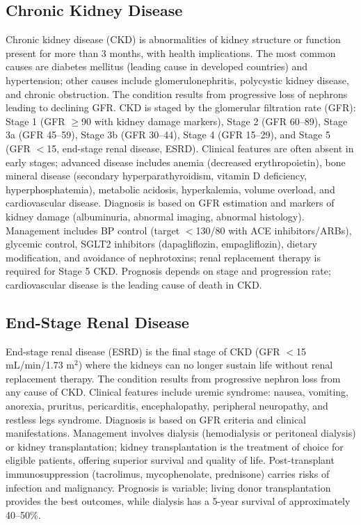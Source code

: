 
\label{sec:section:Chronic Kidney Disease}

\subsection{Chronic Kidney Disease}
\label{sec:Chronic Kidney Disease}
Chronic kidney disease (CKD) is abnormalities of kidney structure or function present for more than 3 months, with health implications. The most common causes are diabetes mellitus (leading cause in developed countries) and hypertension; other causes include glomerulonephritis, polycystic kidney disease, and chronic obstruction. The condition results from progressive loss of nephrons leading to declining GFR. CKD is staged by the glomerular filtration rate (GFR): Stage 1 (GFR $\geq$90 with kidney damage markers), Stage 2 (GFR 60--89), Stage 3a (GFR 45--59), Stage 3b (GFR 30--44), Stage 4 (GFR 15--29), and Stage 5 (GFR $<$15, end-stage renal disease, ESRD). Clinical features are often absent in early stages; advanced disease includes anemia (decreased erythropoietin), bone mineral disease (secondary hyperparathyroidism, vitamin D deficiency, hyperphosphatemia), metabolic acidosis, hyperkalemia, volume overload, and cardiovascular disease. Diagnosis is based on GFR estimation and markers of kidney damage (albuminuria, abnormal imaging, abnormal histology). Management includes BP control (target $<$130/80 with ACE inhibitors/ARBs), glycemic control, SGLT2 inhibitors (dapagliflozin, empagliflozin), dietary modification, and avoidance of nephrotoxins; renal replacement therapy is required for Stage 5 CKD. Prognosis depends on stage and progression rate; cardiovascular disease is the leading cause of death in CKD.

\subsection{End-Stage Renal Disease}
\label{sec:End-Stage Renal Disease}
End-stage renal disease (ESRD) is the final stage of CKD (GFR $<$15 mL/min/1.73 m$^2$) where the kidneys can no longer sustain life without renal replacement therapy. The condition results from progressive nephron loss from any cause of CKD. Clinical features include uremic syndrome: nausea, vomiting, anorexia, pruritus, pericarditis, encephalopathy, peripheral neuropathy, and restless legs syndrome. Diagnosis is based on GFR criteria and clinical manifestations. Management involves dialysis (hemodialysis or peritoneal dialysis) or kidney transplantation; kidney transplantation is the treatment of choice for eligible patients, offering superior survival and quality of life. Post-transplant immunosuppression (tacrolimus, mycophenolate, prednisone) carries risks of infection and malignancy. Prognosis is variable; living donor transplantation provides the best outcomes, while dialysis has a 5-year survival of approximately 40--50\%.

